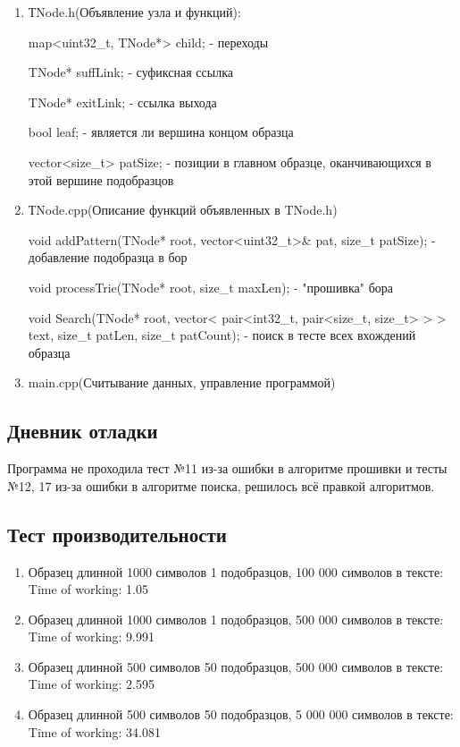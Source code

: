 \documentclass[12pt]{article}
\begin{document}
\begin{enumerate}
\item ТNode.h(Объявление узла и функций):
\par map<uint32\_t, TNode*> child; - переходы
\par TNode* suffLink; - суфиксная ссылка
\par TNode* exitLink; - ссылка выхода
\par bool leaf; - является ли вершина концом образца
\par vector<size\_t> patSize; - позиции в главном образце, оканчивающихся в этой вершине подобразцов
\item ТNode.cpp(Описание функций объявленных в TNode.h)
\par void addPattern(TNode* root, vector<uint32\_t>\& pat, size\_t patSize); - добавление подобразца в бор
\par void processTrie(TNode* root, size\_t maxLen); - "прошивка" бора
\par void Search(TNode* root, vector< pair<int32\_t, pair<size\_t, size\_t> > > text, size\_t patLen, size\_t patCount); - поиск в тесте всех вхождений образца
\item main.cpp(Считывание данных, управление программой)
\end{enumerate}

\subsection*{Дневник отладки}

Программа не проходила тест №11 из-за ошибки в алгоритме прошивки и тесты №12, 17 из-за ошибки в алгоритме поиска, решилось всё правкой алгоритмов. 

\subsection*{Тест производительности}
\begin{enumerate}
	\item Образец длинной 1000 символов 1 подобразцов, 100 000 символов в тексте:  \\ Time of working: 1.05
	\item  Образец длинной 1000 символов 1 подобразцов, 500 000 символов в тексте: \\ Time of working: 9.991
	\item Образец длинной 500 символов 50 подобразцов, 500 000 символов в тексте: \\ Time of working: 2.595
	\item Образец длинной 500 символов 50 подобразцов, 5 000 000 символов в тексте: \\ Time of working: 34.081
	


	
\end{enumerate}
\end{document}
